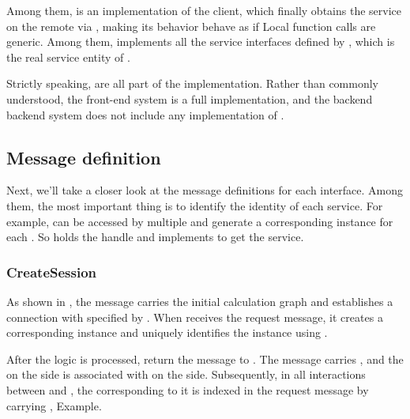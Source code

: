 \begin{content}
Among them,  is an implementation of the  client, which finally obtains the  service on the remote  via , making its behavior behave as if Local function calls are generic. Among them,  implements all the service interfaces defined by , which is the real service entity of .

\begin{remark}
Strictly speaking,  are all part of the  implementation. Rather than commonly understood, the  front-end system is a full  implementation, and the backend  backend system does not include any implementation of .
\end{remark}


\subsection{Message definition}
Next, we'll take a closer look at the message definitions for each interface. Among them, the most important thing is to identify the identity of each service. For example,  can be accessed by multiple  and generate a corresponding  instance for each . So  holds the  handle and implements  to get the  service.


\subsubsection{CreateSession}
As shown in , the  message carries the initial calculation graph and establishes a connection with  specified by . When  receives the request message, it creates a corresponding  instance and uniquely identifies the  instance using .

After the  logic is processed, return the message  to . The  message carries , and the  on the  side is associated with  on the  side. Subsequently, in all interactions between  and , the  corresponding to it is indexed in the request message by carrying ,  Example.


\end{content}
